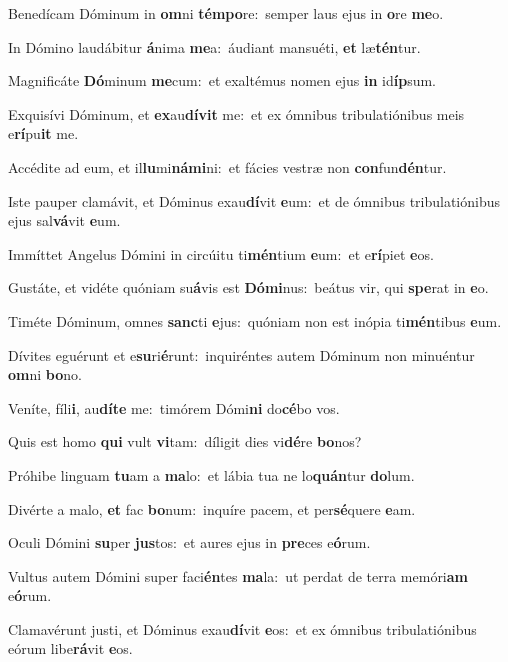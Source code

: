 \item Benedícam Dóminum in \textbf{om}ni \textbf{témpo}re:~\psstar semper laus ejus in \textbf{o}re \textbf{me}o.
\item In Dómino laudábitur \textbf{á}nima \textbf{me}a:~\psstar áudiant mansuéti, \textbf{et} læ\textbf{tén}tur.
\item Magnificáte \textbf{Dó}minum \textbf{me}cum:~\psstar et exaltémus nomen ejus \textbf{in} id\textbf{íp}sum.
\item Exquisívi Dóminum, et \textbf{ex}au\textbf{dívit} me:~\psstar et ex ómnibus tribulatiónibus meis e\textbf{rí}pu\textbf{it} me.
\item Accédite ad eum, et il\textbf{lu}mi\textbf{námi}ni:~\psstar et fácies vestræ non \textbf{con}fun\textbf{dén}tur.
\item Iste pauper clamávit, et Dóminus exau\textbf{dí}vit \textbf{e}um:~\psstar et de ómnibus tribulatiónibus ejus sal\textbf{vá}vit \textbf{e}um.
\item Immíttet Angelus Dómini in circúitu ti\textbf{mén}tium \textbf{e}um:~\psstar et e\textbf{rí}piet \textbf{e}os.
\item Gustáte, et vidéte quóniam su\textbf{á}vis est \textbf{Dómi}nus:~\psstar beátus vir, qui \textbf{spe}rat in \textbf{e}o.
\item Timéte Dóminum, omnes \textbf{sanc}ti \textbf{e}jus:~\psstar quóniam non est inópia ti\textbf{mén}tibus \textbf{e}um.
\item Dívites eguérunt et e\textbf{su}ri\textbf{é}runt:~\psstar inquiréntes autem Dóminum non minuéntur \textbf{om}ni \textbf{bo}no.
\item Veníte, fíli\textbf{i}, au\textbf{díte} me:~\psstar timórem Dómi\textbf{ni} do\textbf{cé}bo vos.
\item Quis est homo \textbf{qui} vult \textbf{vi}tam:~\psstar díligit dies vi\textbf{dé}re \textbf{bo}nos?
\item Próhibe linguam \textbf{tu}am a \textbf{ma}lo:~\psstar et lábia tua ne lo\textbf{quán}tur \textbf{do}lum.
\item Divérte a malo, \textbf{et} fac \textbf{bo}num:~\psstar inquíre pacem, et per\textbf{sé}quere \textbf{e}am.
\item Oculi Dómini \textbf{su}per \textbf{jus}tos:~\psstar et aures ejus in \textbf{pre}ces e\textbf{ó}rum.
\item Vultus autem Dómini super faci\textbf{én}tes \textbf{ma}la:~\psstar ut perdat de terra memóri\textbf{am} e\textbf{ó}rum.
\item Clamavérunt justi, et Dóminus exau\textbf{dí}vit \textbf{e}os:~\psstar et ex ómnibus tribulatiónibus eórum libe\textbf{rá}vit \textbf{e}os.
